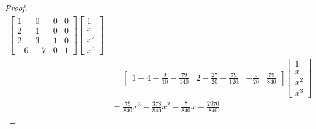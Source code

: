 \begin{proof}
\begin{align*}
       \left[\begin{array}{rrrr}
          1  &   0  & 0  & 0  \\
          2  &   1  & 0  & 0  \\
          2  &   3  & 1  & 0  \\
         -6  &  -7  & 0  & 1
       \end{array}\right]
       \left[\begin{array}{l}
         1   \\
         x   \\
         x^2 \\
         x^3
       \end{array}\right]
  \\&= \left[\begin{array}{c|c|c|c}
          1 + 4 - \frac{9}{10} - \frac{79}{140}  &
          2 - \frac{27}{20} -\frac{79}{120}      &
          -\frac{9}{20}                          &
          \frac{79}{840}
       \end{array}\right]
       \left[\begin{array}{l}
         1   \\
         x   \\
         x^2 \\
         x^3
       \end{array}\right]
  \\&= \frac{79}{840}x^3 - \frac{378}{840}x^2 - \frac{7}{840}x + \frac{2970}{840}
\end{align*}
\end{proof}




